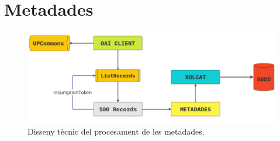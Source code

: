 \section{Metadades}\label{sec:metadata}

\begin{figure}[htbp]
    \centerline{\includegraphics[width=1.2\textwidth]{figures/metadata-processing}}
    \captionsetup{justification=centering}
    \caption{Disseny tècnic del procesament de les metadades.}\label{fig:log-analysis}
\end{figure}
